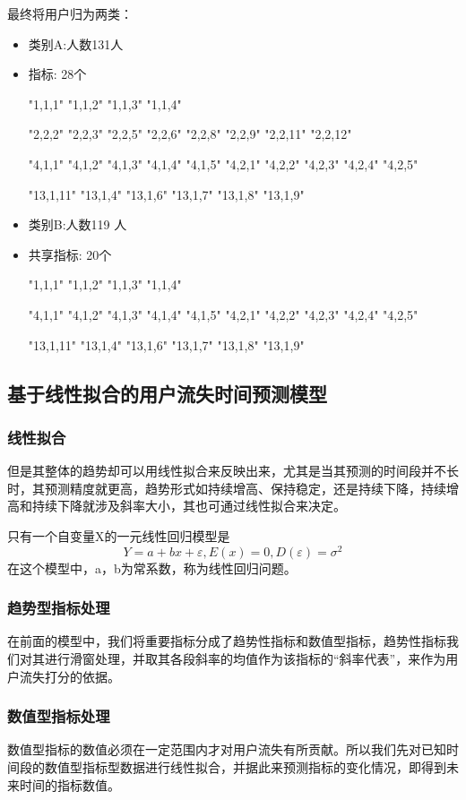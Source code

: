 \documentclass{my_paper}
\begin{document}
最终将用户归为两类：
\begin{itemize}
    \item 类别A:人数131人
    \item 指标: 28个
    
    "1,1,1"	"1,1,2"	"1,1,3"	"1,1,4"	

    "2,2,2"	"2,2,3"	"2,2,5"	"2,2,6"	"2,2,8"	"2,2,9" "2,2,11" "2,2,12"	

    "4,1,1"	"4,1,2"	"4,1,3"	"4,1,4"	"4,1,5"	"4,2,1"	"4,2,2"	"4,2,3"	"4,2,4"	"4,2,5"

    "13,1,11"	"13,1,4"	"13,1,6"	"13,1,7"	"13,1,8"	"13,1,9"

    \item 类别B:人数119 人
    \item 共享指标: 20个
    
    "1,1,1"	"1,1,2"	"1,1,3"	"1,1,4"	

    "4,1,1"	"4,1,2"	"4,1,3"	"4,1,4"	"4,1,5"	"4,2,1"	"4,2,2"	"4,2,3"	"4,2,4"	"4,2,5"

    "13,1,11"	"13,1,4"	"13,1,6"	"13,1,7"	"13,1,8"	"13,1,9"

\end{itemize}
\subsection{基于线性拟合的用户流失时间预测模型}
\subsubsection{线性拟合}
但是其整体的趋势却可以用线性拟合来反映出来，尤其是当其预测的时间段并不长时，其预测精度就更高，趋势形式如持续增高、保持稳定，还是持续下降，持续增高和持续下降就涉及斜率大小，其也可通过线性拟合来决定。

只有一个自变量X的一元线性回归模型是
$$Y=a+bx+\varepsilon ,E(x)=0,D(\varepsilon )=\sigma ^2$$
在这个模型中，a，b为常系数，称为线性回归问题。

\subsubsection{趋势型指标处理}
在前面的模型中，我们将重要指标分成了趋势性指标和数值型指标，趋势性指标我们对其进行滑窗处理，并取其各段斜率的均值作为该指标的“斜率代表”，来作为用户流失打分的依据。
\subsubsection{数值型指标处理}
数值型指标的数值必须在一定范围内才对用户流失有所贡献。所以我们先对已知时间段的数值型指标型数据进行线性拟合，并据此来预测指标的变化情况，即得到未来时间的指标数值。
\end{document}
